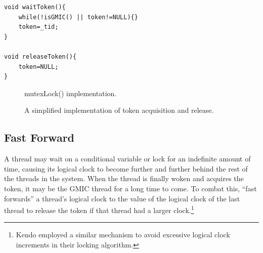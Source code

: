 \newsavebox{\waitToken}
\begin{lrbox}{\waitToken}%
\begin{lstlisting}
void waitToken(){
	while(!isGMIC() || token!=NULL){}
	token=_tid;
}

void releaseToken(){
	token=NULL;
}
\end{lstlisting}
\end{lrbox}

\begin{figure}
\hspace*{.5cm}
\usebox{\mutexLock}
\caption{mutexLock() implementation.}
\label{f:mutexLock}
\end{figure}


\begin{figure}
\hspace*{.5cm}
\usebox{\waitToken}
\caption{A simplified implementation of token acquisition and release.}
\label{f:waitToken}
\end{figure}


\subsection{Fast Forward}
\label{s:fast-forward}

A thread may wait on a conditional variable or lock for an indefinite amount of time, causing its logical clock to become further and further behind the rest of the threads in the system. When the thread is finally woken and acquires the token, it may be the GMIC thread for a long time to come. To combat this, \lib{} ``fast forwards'' a thread's logical clock to the value of the logical clock of the last thread to release the token if that thread had a larger clock.\footnote{Kendo \cite{olszewski_kendo:_2009} employed a similar mechanism to avoid excessive logical clock increments in their locking algorithm.} 

